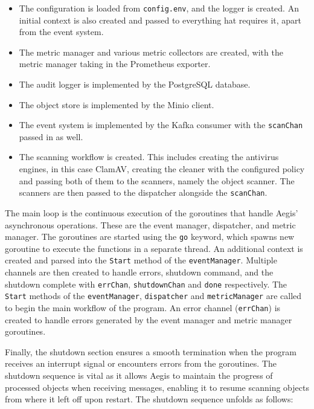 \documentclass[12pt, conference, final, a4paper, onecolumn, compsoc]{IEEEtran}
\begin{document}
\medskip
\begin{itemize}
  \item The configuration is loaded from \texttt{config.env}, and the logger is
        created. An initial context is also created and passed to everything hat
        requires it, apart from the event system.
  \item The metric manager and various metric collectors are created, with the
        metric manager taking in the Prometheus exporter.
  \item The audit logger is implemented by the PostgreSQL database.
  \item The object store is implemented by the Minio client.
  \item The event system is implemented by the Kafka consumer with the
        \texttt{scanChan} passed in as well.
  \item The scanning workflow is created. This includes creating the antivirus
        engines, in this case ClamAV, creating the cleaner with the configured
        policy and passing both of them to the scanners, namely the object
        scanner. The scanners are then passed to the dispatcher alongside the
        \texttt{scanChan}.
\end{itemize}
\bigskip



The main loop is the continuous execution of the goroutines that handle Aegis'
asynchronous operations. These are the event manager, dispatcher, and metric
manager. The goroutines are started using the \texttt{go} keyword, which spawns
new goroutine to execute the functions in a separate thread. An additional
context is created and parsed into the \texttt{Start} method of the
\texttt{eventManager}. Multiple channels are then created to handle errors,
shutdown command, and the shutdown complete with \texttt{errChan},
\texttt{shutdownChan} and \texttt{done} respectively. The \texttt{Start} methods
of the \texttt{eventManager}, \texttt{dispatcher} and \texttt{metricManager} are
called to begin the main workflow of the program. An error channel
(\texttt{errChan}) is created to handle errors generated by the event manager
and metric manager goroutines.


Finally, the shutdown section ensures a smooth termination when the program
receives an interrupt signal or encounters errors from the goroutines. The
shutdown sequence is vital as it allows Aegis to maintain the progress of
processed objects when receiving messages, enabling it to resume scanning
objects from where it left off upon restart. The shutdown sequence unfolds as
follows:
\end{document}
